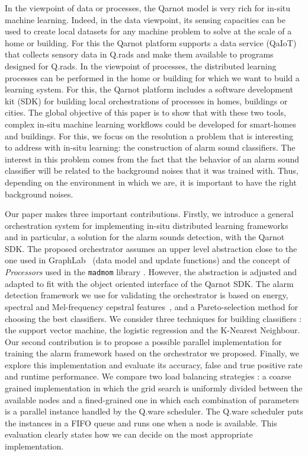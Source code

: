 \documentclass[10pt, conference, compsocconf]{IEEEtran}
\begin{document}
In the viewpoint of data or processes, the Qarnot model is very rich for in-situ machine learning. Indeed, in the data viewpoint, 
its sensing capacities can be used to create local datasets for any machine problem to solve at the scale of a home or building. 
For this the Qarnot platform supports a data service (QaIoT) that collects sensory data in Q.rads 
and make them available to programs designed for Q.rads. 
In the viewpoint of processes, the distributed learning processes can be performed in the home or building for which we want to 
build a learning system. For this, the Qarnot platform includes a software development kit (SDK) for building local orchestrations 
of processes in homes, buildings or cities.
The global objective of this paper is to show that with these two tools, 
complex in-situ machine learning workflows could be developed for smart-homes and buildings. For this, we focus on the resolution 
a problem that is interesting to address with in-situ learning: the construction of alarm sound classifiers. 
The interest in this problem comes from the fact that the behavior of an alarm sound classifier will be related to the background noises that 
it was trained with. Thus, depending on the environment in which we are, it is important to have the right background noises.

Our paper makes three important contributions. Firstly, we introduce a general orchestration system for implementing in-situ 
distributed learning frameworks and in particular, a solution for the alarm sounds detection, with the Qarnot SDK. 
The proposed orchestrator assumes an upper level abstraction close to the one used in GraphLab~\cite{Low:2012:DGF:2212351.2212354} (data model 
and update functions) and the concept of {\it Processors} used in the \texttt{madmom} library \cite{DBLP:journals/corr/BockKSKW16}. However, the abstraction is adjusted and adapted to fit with the object oriented interface 
of the Qarnot SDK. 
The alarm detection framework we use for validating the orchestrator is based on energy, spectral and Mel-frequency cepstral features~\cite{Davis:1990:CPR:108235.108239}, \cite{pyAudioAnalysis}
and a Pareto-selection method for choosing the best classifiers. We consider three techniques for building classifiers : the support vector machine, the logistic regression and the K-Nearest Neighbour. Our second contribution is to propose a possible parallel 
implementation for training the alarm framework based on the orchestrator we proposed. Finally, we explore this implementation and evaluate its accuracy, 
false and true positive rate and runtime performance. We compare two load balancing strategies : a coarse grained implementation in which the grid search is uniformly divided between the available nodes and a fined-grained one in which each combination of parameters is a parallel instance handled by the Q.ware scheduler. The Q.ware scheduler puts the instances in a FIFO queue and runs one when a node is available. This evaluation clearly states how we can decide on the most appropriate implementation. 
\end{document}
